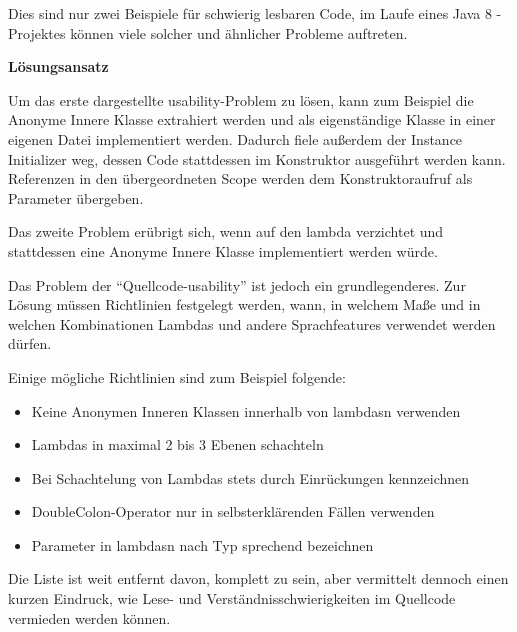 Dies sind nur zwei Beispiele für schwierig lesbaren Code, im Laufe eines Java 8 -Projektes können viele solcher und ähnlicher Probleme auftreten.

\textbf{Lösungsansatz}

Um das erste dargestellte \gls{usability}-Problem zu lösen, kann zum Beispiel die Anonyme Innere Klasse extrahiert werden und als eigenständige Klasse in einer eigenen Datei implementiert werden. Dadurch fiele außerdem der Instance Initializer weg, dessen Code stattdessen im Konstruktor ausgeführt werden kann. Referenzen in den übergeordneten Scope werden dem Konstruktoraufruf als Parameter übergeben.

Das zweite Problem erübrigt sich, wenn auf den \gls{lambda} verzichtet und stattdessen eine Anonyme Innere Klasse implementiert werden würde.

Das Problem der \enquote{Quellcode-\gls{usability}} ist jedoch ein grundlegenderes. Zur Lösung müssen Richtlinien festgelegt werden, wann, in welchem Maße und in welchen Kombinationen Lambdas und andere Sprachfeatures verwendet werden dürfen.

Einige mögliche Richtlinien sind zum Beispiel folgende:

\begin{itemize}
	\item Keine Anonymen Inneren Klassen innerhalb von \glspl{lambda}n verwenden
	\item Lambdas in maximal 2 bis 3 Ebenen schachteln
	\item Bei Schachtelung von Lambdas stets durch Einrückungen kennzeichnen
	\item DoubleColon-Operator nur in selbsterklärenden Fällen verwenden
	\item Parameter in \glspl{lambda}n nach Typ sprechend bezeichnen
\end{itemize}

Die Liste ist weit entfernt davon, komplett zu sein, aber vermittelt dennoch einen kurzen Eindruck, wie Lese- und Verständnisschwierigkeiten im Quellcode vermieden werden können.